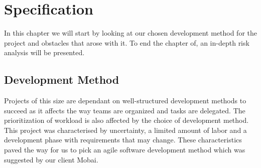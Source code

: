 \chapter{Specification}
\label{chap:Specification}
In this chapter we will start by looking at our chosen development method for the project and obstacles that arose with it. To end the chapter of, an in-depth risk analysis will be presented.


\section{Development Method}
Projects of this size are dependant on well-structured development methods to succeed as it affects the way teams are organized and tasks are delegated. The prioritization of workload is also affected by the choice of development method. 
This project was characterised by uncertainty, a limited amount of labor and a development phase with requirements that may change. These characteristics paved the way for us to pick an agile software development method which was suggested by our client Mobai.  
